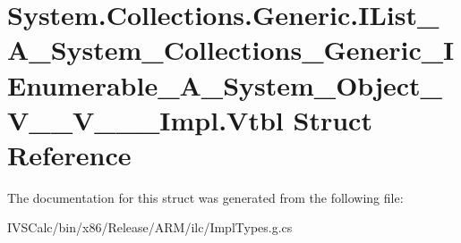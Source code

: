 \hypertarget{struct_system_1_1_collections_1_1_generic_1_1_i_list___a___system___collections___generic___i_ena70f68894e8e37ffd8086738d6684a6d}{}\section{System.\+Collections.\+Generic.\+I\+List\+\_\+\+A\+\_\+\+System\+\_\+\+Collections\+\_\+\+Generic\+\_\+\+I\+Enumerable\+\_\+\+A\+\_\+\+System\+\_\+\+Object\+\_\+\+V\+\_\+\+\_\+\+V\+\_\+\+\_\+\+\_\+\+Impl.\+Vtbl Struct Reference}
\label{struct_system_1_1_collections_1_1_generic_1_1_i_list___a___system___collections___generic___i_ena70f68894e8e37ffd8086738d6684a6d}


The documentation for this struct was generated from the following file\+:\begin{DoxyCompactItemize}
\item 
I\+V\+S\+Calc/bin/x86/\+Release/\+A\+R\+M/ilc/Impl\+Types.\+g.\+cs\end{DoxyCompactItemize}
